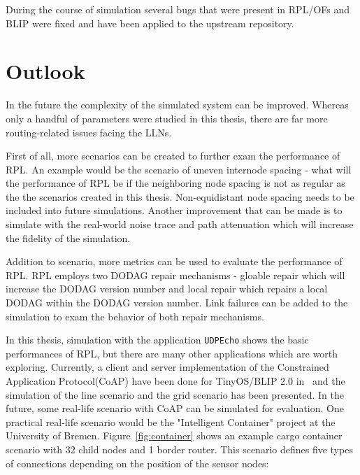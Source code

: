 During the course of simulation several bugs that were present in RPL/OFs and BLIP were fixed and have been applied to the upstream repository.

\section{Outlook}
\label{outlook}




In the future the complexity of the simulated system can be improved. Whereas only a handful of parameters were studied in this thesis, there are far more routing-related issues facing the LLNs.
 
First of all, more scenarios can be created to further exam the performance of RPL. An example would be the scenario of uneven internode spacing - what will the performance of RPL be if the neighboring node spacing is not as regular as the the scenarios created in this thesis. Non-equidistant node spacing needs to be included into future simulations. Another improvement that can be made is to simulate with the real-world noise trace and path attenuation which will increase the fidelity of the simulation. 

Addition to scenario, more metrics can be used to evaluate the performance of RPL. RPL employs two DODAG repair mechanisms - gloable repair which will increase the DODAG version number and local repair which repairs  a local DODAG within the DODAG version number. Link failures can be added to the simulation to exam the behavior of both repair mechanisms.

In this thesis, simulation with the application \texttt{UDPEcho} shows the basic performances of RPL, but there are many other applications which are worth exploring. Currently, a client and server implementation of the Constrained Application Protocol(CoAP) have been done for TinyOS/BLIP 2.0 in~\cite{TP11} and the simulation of the line scenario and the grid scenario has been presented. In the future, some real-life scenario with CoAP can be simulated for evaluation. One practical real-life scenario would be the "Intelligent Container" project at the University of Bremen. Figure~\ref{fig:container} shows an example cargo container scenario with 32 child nodes and 1 border router. This scenario defines five types of connections depending on the position of the sensor nodes:

